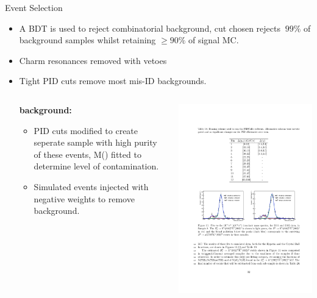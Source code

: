 \documentclass{beamer}
\begin{document}
\begin{frame}{Event Selection}
  \begin{itemize}
  \item A BDT is used to reject combinatorial background, cut chosen rejects $~99\%$ of background samples whilst retaining $\geq90\%$ of signal MC.
  \item Charm resonances removed with vetoes
  \item Tight PID cuts remove most mis-ID backgrounds. \\ \vspace{0.2cm}
    \begin{columns}
      \begin{column}{0.6\textwidth}
        \textbf{\decay{\Bs}{\Kstarz\Kstarzb} background:}
        \begin{itemize}
        \item PID cuts modified to create seperate sample with high purity of these events, M(\kaon\pion\kaon\pion) fitted to determine level of contamination.
        \item Simulated \decay{\Bs}{\Kstarz\Kstarzb} events injected with negative weights to remove \decay{\Bs}{\Kstarz(\Km\pip)\Kstarzb(\Kp\pim)} background.
        \end{itemize}
      \end{column}
      \begin{column}{0.39\textwidth}
        \includegraphics[width=\textwidth]{KstarKstarSelection.pdf}

\end{column}
\end{columns}
\end{itemize}
\end{frame}
\end{document}
